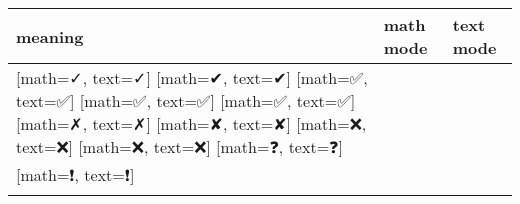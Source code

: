 \documentclass{unittest}
\begin{document}
\begin{tabular}{lll}\toprule

 meaning & \textbf{math mode} & \textbf{text mode} \\\midrule
\makerow{✓}[math=✓, text=✓]
\makerow{✔}[math=✔, text=✔]
\makerow{✅}[math=✅, text=✅]
\makerow{✅}[math=✅, text=✅]
\makerow{✅️}[math=✅️, text=✅️]
\makerow{✗}[math=✗, text=✗]
\makerow{✘}[math=✘, text=✘]
\makerow{❌}[math=❌, text=❌]
\makerow{❌️}[math=❌️, text=❌️]
\makerow{❓}[math=❓, text=❓]
\makerow{❗}[math=❗, text=❗]
\bottomrule
\end{tabular}
\end{document}
